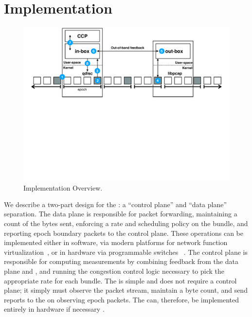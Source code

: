\section{Implementation}\label{s:impl}
\begin{figure}[t]
    \centering
    \includegraphics[width=2\columnwidth]{img/bundler-diagram}
    \caption{\name Implementation Overview.}\label{fig:bundler}
\end{figure}

We describe a two-part design for the \inbox: a ``control plane'' and ``data plane'' separation.
The data plane is responsible for packet forwarding, maintaining a count of the  bytes sent, enforcing a rate and scheduling policy on the bundle, and reporting epoch boundary packets to the control plane.
These operations can be implemented either in software, via modern platforms for network function virtualization~\cite{bess, click, mos, netbricks}, or in hardware via programmable switches~\cite{p4} .
The control plane is responsible for computing measurements by combining feedback from the data plane and \outbox, and running the congestion control logic necessary to pick the appropriate rate for each bundle.
The \outbox is simple and does not require a control plane; it simply must observe the packet stream, maintain a byte count, and send reports to the \inbox on observing epoch packets.
The \outbox can, therefore, be implemented entirely in hardware if necessary .

